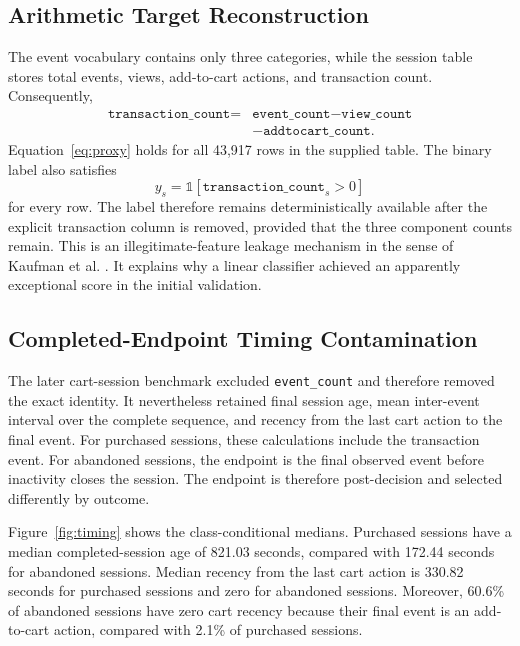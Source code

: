 \documentclass[conference, letterpaper]{IEEEtran}
\begin{document}
\subsection{Arithmetic Target Reconstruction}
\label{sec:proxy}
The event vocabulary contains only three categories, while the session table stores total events, views, add-to-cart actions, and transaction count. Consequently,
\begin{equation}
\begin{aligned}
\texttt{transaction\_count}={}&\texttt{event\_count}-\texttt{view\_count}\\
&-\texttt{addtocart\_count}.
\end{aligned}
\label{eq:proxy}
\end{equation}
Equation~\ref{eq:proxy} holds for all 43,917 rows in the supplied table. The binary label also satisfies
\begin{equation}
 y_s=\mathbb{1}[\texttt{transaction\_count}_s>0]
\label{eq:label}
\end{equation}
for every row. The label therefore remains deterministically available after the explicit transaction column is removed, provided that the three component counts remain. This is an illegitimate-feature leakage mechanism in the sense of Kaufman et al. \cite{kaufman2012}. It explains why a linear classifier achieved an apparently exceptional score in the initial validation.

\subsection{Completed-Endpoint Timing Contamination}
\label{sec:endpoint}
The later cart-session benchmark excluded \texttt{event\_count} and therefore removed the exact identity. It nevertheless retained final session age, mean inter-event interval over the complete sequence, and recency from the last cart action to the final event. For purchased sessions, these calculations include the transaction event. For abandoned sessions, the endpoint is the final observed event before inactivity closes the session. The endpoint is therefore post-decision and selected differently by outcome.

Figure~\ref{fig:timing} shows the class-conditional medians. Purchased sessions have a median completed-session age of 821.03 seconds, compared with 172.44 seconds for abandoned sessions. Median recency from the last cart action is 330.82 seconds for purchased sessions and zero for abandoned sessions. Moreover, 60.6\% of abandoned sessions have zero cart recency because their final event is an add-to-cart action, compared with 2.1\% of purchased sessions.
\end{document}
